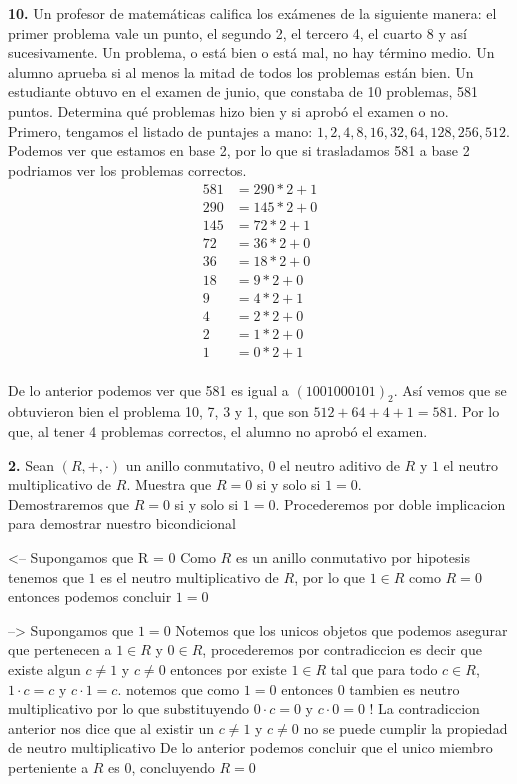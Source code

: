 \documentclass[12pt]{article}
\begin{document}
\vspace{1cm}

%
%
\textbf{10.} Un profesor de matemáticas califica los exámenes de la siguiente manera: el primer problema vale un
punto, el segundo 2, el tercero 4, el cuarto 8 y así sucesivamente. Un problema, o está bien o está mal, no hay
término medio. Un alumno aprueba si al menos la mitad de todos los problemas están bien. Un estudiante
obtuvo en el examen de junio, que constaba de 10 problemas, 581 puntos. Determina qué problemas hizo bien
y si aprobó el examen o no.\\

Primero, tengamos el listado de puntajes a mano: $1, 2, 4, 8, 16, 32, 64, 128, 256, 512$.\\

Podemos ver que estamos en base 2, por lo que si trasladamos 581 a base 2 podriamos ver los problemas correctos.
\begin{align*}
    581 &= 290 \ast 2 + 1\\
    290 &= 145 \ast 2 + 0\\
    145 &= 72 \ast 2 + 1\\
    72 &= 36 \ast 2 + 0\\
    36 &= 18 \ast 2 + 0\\
    18 &= 9 \ast 2 + 0\\
    9 &= 4 \ast 2 + 1\\
    4 &= 2 \ast 2 + 0\\
    2 &= 1 \ast 2 + 0\\
    1 &= 0 \ast 2 + 1\\
\end{align*}

De lo anterior podemos ver que 581 es igual a $(1001000101)_2$. Así vemos que se obtuvieron bien el problema 10, 7, 3 y 1, que son
$512 + 64 + 4 + 1 = 581$. Por lo que, al tener 4 problemas correctos, el alumno no aprobó el examen.

%
%
\textbf{2.} Sean $(R, +, ·)$ un anillo conmutativo, $0$ el neutro aditivo de $R$ y $1$ el neutro multiplicativo de $R$. Muestra
que $R = {0}$ si y solo si $1 = 0$. \\

Demostraremos que $R = {0}$ si y solo si $1 = 0$.
Procederemos por doble implicacion para demostrar nuestro bicondicional

<--
Supongamos que R = {0}
Como $R$ es un anillo conmutativo por hipotesis tenemos que $1$ es el neutro multiplicativo de $R$, por lo que $1 \in R$ como $R = {0}$ entonces podemos concluir
$1 = 0$

-->
Supongamos que $1 = 0$
Notemos que los unicos objetos que podemos asegurar que pertenecen a $1 \in R$ y $0 \in R$, procederemos por contradiccion es decir que existe algun $c \neq 1$ y $c \neq 0$ entonces
por existe $1 \in R$ tal que para todo $c \in R$, $1 · c = c$ y $c · 1 = c$.
notemos que como $1 = 0$ entonces $0$ tambien es neutro multiplicativo por lo que substituyendo
$0 · c = 0$ y $c · 0 = 0$ !
La contradiccion anterior nos dice que al existir un $c \neq 1$ y $c \neq 0$ no se puede cumplir la propiedad de neutro multiplicativo
De lo anterior podemos concluir que el unico miembro perteniente a $R$ es $0$, concluyendo $R = {0}$
\end{document}
